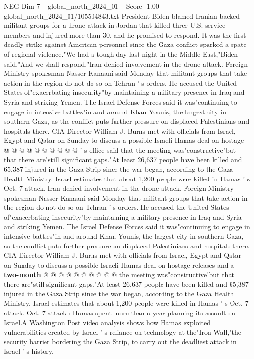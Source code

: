 \begin{textsample}{NEG Dim 7 – global\_north\_2024\_01 – Score -1.00 – global\_north\_2024\_01/105504843.txt}  \label{ex:f7_neg_261}
President Biden blamed Iranian-backed militant groups for a drone attack in Jordan that killed three U.S. service members and injured more than 30, and he promised to respond.
It was the first deadly strike against American personnel since the Gaza conflict sparked a spate of regional violence."We had a tough day last night in the Middle East,"Biden said."And we shall respond."Iran denied involvement in the drone attack.
Foreign Ministry spokesman Nasser Kanaani said Monday that militant groups that take action in the region do not do so on Tehran ' s orders.
He accused the United States of"exacerbating insecurity"by maintaining a military presence in Iraq and Syria and striking Yemen.
The Israel Defense Forces said it was"continuing to engage in intensive battles"in and around Khan Younis, the largest city in southern Gaza, as the conflict puts further pressure on displaced Palestinians and hospitals there.
CIA Director William J.
Burns met with officials from Israel, Egypt and Qatar on Sunday to discuss a possible Israeli-Hamas deal on hostage @ @ @ @ @ @ @ @ @ @ ' s office said that the meeting was"constructive"but that there are"still significant gaps."At least 26,637 people have been killed and 65,387 injured in the Gaza Strip since the war began, according to the Gaza Health Ministry.
Israel estimates that about 1,200 people were killed in Hamas ' s Oct. 7 attack.
Iran denied involvement in the drone attack.
Foreign Ministry spokesman Nasser Kanaani said Monday that militant groups that take action in the region do not do so on Tehran ' s orders.
He accused the United States of"exacerbating insecurity"by maintaining a military presence in Iraq and Syria and striking Yemen.
The Israel Defense Forces said it was"continuing to engage in intensive battles"in and around Khan Younis, the largest city in southern Gaza, as the conflict puts further pressure on displaced Palestinians and hospitals there.
CIA Director William J.
Burns met with officials from Israel, Egypt and Qatar on Sunday to discuss a possible Israeli-Hamas deal on hostage releases and a \textbf{two-month} @ @ @ @ @ @ @ @ @ @ the meeting was"constructive"but that there are"still significant gaps."At least 26,637 people have been killed and 65,387 injured in the Gaza Strip since the war began, according to the Gaza Health Ministry.
Israel estimates that about 1,200 people were killed in Hamas ' s Oct. 7 attack.
Oct. 7 attack : Hamas spent more than a year planning its assault on Israel.A Washington Post video analysis shows how Hamas exploited vulnerabilities created by Israel ' s reliance on technology at the"Iron Wall,"the security barrier bordering the Gaza Strip, to carry out the deadliest attack in Israel ' s history.

\end{textsample}
